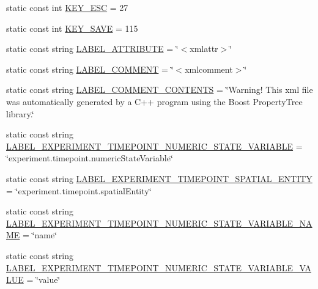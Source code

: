 \begin{DoxyCompactItemize}
\item 
static const int \hyperlink{classmultiscale_1_1analysis_1_1Detector_a0d1f2fd9eae1b166ac097668889c02aa}{\-K\-E\-Y\-\_\-\-E\-S\-C} = 27
\item 
static const int \hyperlink{classmultiscale_1_1analysis_1_1Detector_aa9acc60392e3eb0f0a9c3019c63301ae}{\-K\-E\-Y\-\_\-\-S\-A\-V\-E} = 115
\item 
static const string \hyperlink{classmultiscale_1_1analysis_1_1Detector_aa82a238495f03f285893ea3345437224}{\-L\-A\-B\-E\-L\-\_\-\-A\-T\-T\-R\-I\-B\-U\-T\-E} = \char`\"{}$<$xmlattr$>$\char`\"{}
\item 
static const string \hyperlink{classmultiscale_1_1analysis_1_1Detector_a561d5a58b94e4ccce28726c98f6ca71e}{\-L\-A\-B\-E\-L\-\_\-\-C\-O\-M\-M\-E\-N\-T} = \char`\"{}$<$xmlcomment$>$\char`\"{}
\item 
static const string \hyperlink{classmultiscale_1_1analysis_1_1Detector_adf6527cf12c5267d28210a0a60ce43cf}{\-L\-A\-B\-E\-L\-\_\-\-C\-O\-M\-M\-E\-N\-T\-\_\-\-C\-O\-N\-T\-E\-N\-T\-S} = \char`\"{}\-Warning! \-This xml file was automatically generated by a \-C++ program using the \-Boost \-Property\-Tree library.\char`\"{}
\item 
static const string \hyperlink{classmultiscale_1_1analysis_1_1Detector_ae56e690220d68c5961b210e49d90c6f0}{\-L\-A\-B\-E\-L\-\_\-\-E\-X\-P\-E\-R\-I\-M\-E\-N\-T\-\_\-\-T\-I\-M\-E\-P\-O\-I\-N\-T\-\_\-\-N\-U\-M\-E\-R\-I\-C\-\_\-\-S\-T\-A\-T\-E\-\_\-\-V\-A\-R\-I\-A\-B\-L\-E} = \char`\"{}experiment.\-timepoint.\-numeric\-State\-Variable\char`\"{}
\item 
static const string \hyperlink{classmultiscale_1_1analysis_1_1Detector_a8cade9693bb6ce63be30adebd318fd21}{\-L\-A\-B\-E\-L\-\_\-\-E\-X\-P\-E\-R\-I\-M\-E\-N\-T\-\_\-\-T\-I\-M\-E\-P\-O\-I\-N\-T\-\_\-\-S\-P\-A\-T\-I\-A\-L\-\_\-\-E\-N\-T\-I\-T\-Y} = \char`\"{}experiment.\-timepoint.\-spatial\-Entity\char`\"{}
\item 
static const string \hyperlink{classmultiscale_1_1analysis_1_1Detector_a66701b2cd4111a3fd8c6e0a9faafcbc1}{\-L\-A\-B\-E\-L\-\_\-\-E\-X\-P\-E\-R\-I\-M\-E\-N\-T\-\_\-\-T\-I\-M\-E\-P\-O\-I\-N\-T\-\_\-\-N\-U\-M\-E\-R\-I\-C\-\_\-\-S\-T\-A\-T\-E\-\_\-\-V\-A\-R\-I\-A\-B\-L\-E\-\_\-\-N\-A\-M\-E} = \char`\"{}name\char`\"{}
\item 
static const string \hyperlink{classmultiscale_1_1analysis_1_1Detector_a46e4fde2eefd347da05a8c28f55fea8a}{\-L\-A\-B\-E\-L\-\_\-\-E\-X\-P\-E\-R\-I\-M\-E\-N\-T\-\_\-\-T\-I\-M\-E\-P\-O\-I\-N\-T\-\_\-\-N\-U\-M\-E\-R\-I\-C\-\_\-\-S\-T\-A\-T\-E\-\_\-\-V\-A\-R\-I\-A\-B\-L\-E\-\_\-\-V\-A\-L\-U\-E} = \char`\"{}value\char`\"{}

\end{DoxyCompactItemize}
